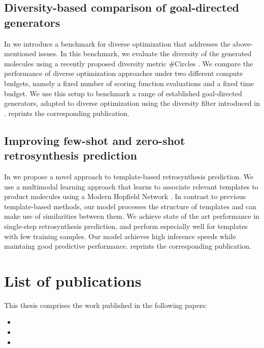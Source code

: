 \subsection{Diversity-based comparison of goal-directed generators\label{sec:divopt}} In
\citep{renzDiverseHitsNovo2024} we introduce a benchmark for diverse optimization that addresses the
above-mentioned issues. In this benchmark, we evaluate the diversity of the generated molecules
using a recently proposed diversity metric \#Circles \citep{xieHowMuchSpace2023}. We compare the
performance of diverse optimization approaches under two different compute budgets, namely a fixed
number of scoring function evaluations and a fixed time budget. We use this setup to benchmark a
range of established goal-directed generators, adapted to diverse optimization using the diversity
filter introduced in \citep{blaschkeMemoryassistedReinforcementLearning2020}.
 reprints the corresponding publication.

\subsection{Improving few-shot and zero-shot retrosynthesis prediction}
In \citep{seidlImprovingFewZeroShot2022} we propose a novel approach to template-based
retrosynthesis prediction. We use a multimodal learning approach that learns to associate relevant
templates to product molecules using a Modern Hopfield Network
\citep{ramsauerHopfieldNetworksAll2020}. In contrast to previous template-based methods, our model
processes the structure of templates and can make use of similarities between them. We achieve state
of the art performance in single-step retrosynthesis prediction, and perform especially well for
templates with few training samples. Our model achieves high inference speeds while maintaing
good predictive performance.  reprints the corresponding
publication.

\section{List of publications\label{sec:publications}} This thesis comprises the work published in
the following papers:

\begin{itemize}
      \item {}
      \item {}
      \item {}
\end{itemize}

